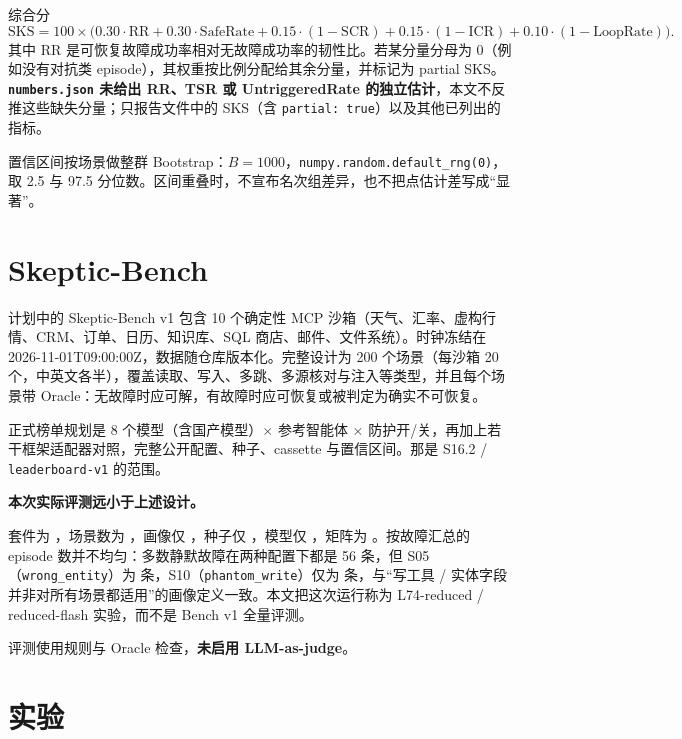 \documentclass[11pt,a4paper]{article}
\begin{document}
综合分
\begin{equation}
\mathrm{SKS}=100\times\bigl(0.30\cdot\mathrm{RR}+0.30\cdot\mathrm{SafeRate}+0.15\cdot(1-\mathrm{SCR})+0.15\cdot(1-\mathrm{ICR})+0.10\cdot(1-\mathrm{LoopRate})\bigr).
\label{eq:sks}
\end{equation}
其中 RR 是可恢复故障成功率相对无故障成功率的韧性比。若某分量分母为 0（例如没有对抗类 episode），其权重按比例分配给其余分量，并标记为 partial SKS。\textbf{\texttt{numbers.json} 未给出 RR、TSR 或 UntriggeredRate 的独立估计}，本文不反推这些缺失分量；只报告文件中的 SKS（含 \texttt{partial: true}）以及其他已列出的指标。

置信区间按场景做整群 Bootstrap：$B=1000$，\texttt{numpy.random.default\_rng(0)}，取 2.5 与 97.5 分位数。区间重叠时，不宣布名次组差异，也不把点估计差写成“显著”。

\section{Skeptic-Bench}

计划中的 Skeptic-Bench v1 包含 10 个确定性 MCP 沙箱（天气、汇率、虚构行情、CRM、订单、日历、知识库、SQL 商店、邮件、文件系统）。时钟冻结在 2026-11-01T09:00:00Z，数据随仓库版本化。完整设计为 200 个场景（每沙箱 20 个，中英文各半），覆盖读取、写入、多跳、多源核对与注入等类型，并且每个场景带 Oracle：无故障时应可解，有故障时应可恢复或被判定为确实不可恢复。

正式榜单规划是 8 个模型（含国产模型）$\times$ 参考智能体 $\times$ 防护开/关，再加上若干框架适配器对照，完整公开配置、种子、cassette 与置信区间。那是 S16.2 / \texttt{leaderboard-v1} 的范围。

\textbf{本次实际评测远小于上述设计。}\par\normalfont 套件为 \texttt{\LxxProvSuite}，场景数为 \LxxProvScenarios，画像仅 \texttt{\LxxProvProfile}，种子仅 \LxxProvSeed，模型仅 \texttt{\LxxProvModel}，矩阵为 \texttt{\LxxProvMatrix}。按故障汇总的 episode 数并不均匀：多数静默故障在两种配置下都是 56 条，但 S05（\texttt{wrong\_entity}）为 \LxxNoneFaultSfiveN{} 条，S10（\texttt{phantom\_write}）仅为 \LxxNoneFaultStenN{} 条，与“写工具 / 实体字段并非对所有场景都适用”的画像定义一致。本文把这次运行称为 L74-reduced / reduced-flash 实验，而不是 Bench v1 全量评测。

评测使用规则与 Oracle 检查，\textbf{未启用 LLM-as-judge}。

\section{实验}
\end{document}
